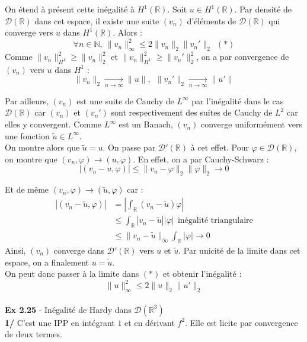 \documentclass[a4paper,12pt]{article}
\begin{document}
On étend à présent cette inégalité à $H^1(\mathbb{R})$. Soit $u \in H^1(\mathbb{R})$. Par densité de $\mathcal{D}(\mathbb{R})$ dans cet espace, il existe une suite $(v_n)$ d'éléments de $\mathcal{D}(\mathbb{R})$ qui converge vers $u$ dans $H^1(\mathbb{R})$. Alors :
$$\forall n \in \mathbb{N}, \ \|v_n\|_{\infty}^2 \leq 2 \|v_n\|_2 \|v_n' \|_2 \ \ (*) $$
Comme $\|v_n\|_{H^1}^2 \geq \|v_n\|^2_2$ et $\|v_n\|_{H^1}^2 \geq \|v_n'\|^2_2$, on a par convergence de $(v_n)$ vers $u$ dans $H^1$ :
$$\|v_n\|_2 \underset{n \to \infty}{\longrightarrow} \|u\| ,\ \ \|v_n'\|_2 \underset{n \to \infty}{\longrightarrow} \|u'\|$$

Par ailleurs, $(v_n)$ est une suite de Cauchy de $L^{\infty}$ par l'inégalité dans le cas $\mathcal{D}(\mathbb{R})$ car $(v_n)$ et $(v_n')$ sont respectivement des suites de Cauchy de $L^2$ car elles y convergent. Comme $L^{\infty}$ est un Banach, $(v_n)$ converge uniformément vers une fonction $\tilde{u} \in L^{\infty}$. \\

On montre alors que $\tilde{u}=u$. On passe par $\mathcal{D}'(\mathbb{R})$ à cet effet. Pour $\varphi \in \mathcal{D}(\mathbb{R})$, on montre que $(v_n, \varphi) \longrightarrow (u, \varphi)$. En effet, on a par Cauchy-Schwarz :
$$|(v_n - u, \varphi)| \leq \| v_n - \varphi \|_2 \| \varphi \|_2 \longrightarrow 0 $$

Et de même $(v_n, \varphi) \longrightarrow (\tilde{u}, \varphi)$ car :
\begin{align*}
|(v_n-\tilde{u}, \varphi)| & = \left|\int_{\mathbb{R}} (v_n-\tilde{u})\varphi \right| \\
	& \leq \int_{\mathbb{R}} |v_n-\tilde{u}||\varphi| \ \ \text{inégalité triangulaire} \\
	& \leq \| v_n-\tilde{u}\|_{\infty} \int_{\mathbb{R}} |\varphi| \longrightarrow 0
\end{align*}
Ainsi, $(v_n)$ converge dans $\mathcal{D}'(\mathbb{R})$ vers $u$ et $\tilde{u}$. Par unicité de la limite dans cet espace, on a finalement $u = \tilde{u}$. \\

On peut donc passer à la limite dans $(*)$ et obtenir l'inégalité :
$$\boxed{\|u\|_{\infty}^2 \leq 2 \|u\|_2 \|u' \|_2 }$$ \\

\textbf{Ex 2.25} - Inégalité de Hardy dans $\mathcal{D}(\mathbb{R}^3)$ \\
\textbf{1/} C'est une IPP en intégrant $1$ et en dérivant $f^2$. Elle est licite par convergence de deux termes. \\
\end{document}

